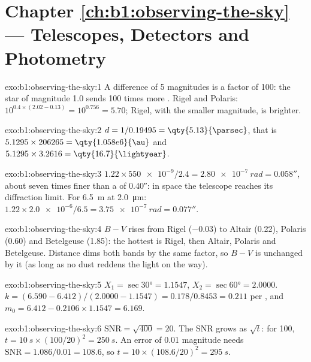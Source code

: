 \section*{Chapter \ref{ch:b1:observing-the-sky} --- Telescopes, Detectors and Photometry}

\begin{solution}{exo:b1:observing-the-sky:1}
A difference of 5 magnitudes is a factor of 100: the star of magnitude 1.0
sends 100 times more . Rigel and Polaris: $10^{0.4\times(2.02 - 0.13)} =
10^{0.756} = 5.70$; Rigel, with the smaller magnitude, is brighter.
\end{solution}

\begin{solution}{exo:b1:observing-the-sky:2}
$d = 1/0.19495 = \qty{5.13}{\parsec}$, that is $5.1295\times206265 =
\qty{1.058e6}{\au}$ and $5.1295\times3.2616 = \qty{16.7}{\lightyear}$.
\end{solution}

\begin{solution}{exo:b1:observing-the-sky:3}
$1.22\times\num{550e-9}/2.4 = \qty{2.80e-7}{rad} = \ang{;;0.058}$, about
seven times finer than a  of \ang{;;0.40}: in space the telescope
reaches its diffraction limit. For \qty{6.5}{m} at \qty{2.0}{\micro\metre}:
$1.22\times\num{2.0e-6}/6.5 = \qty{3.75e-7}{rad} = \ang{;;0.077}$.
\end{solution}

\begin{solution}{exo:b1:observing-the-sky:4}
$B - V$ rises from Rigel ($-0.03$) to Altair (0.22), Polaris (0.60) and
Betelgeuse (1.85): the hottest is Rigel, then Altair, Polaris and
Betelgeuse. Distance dims both bands by the same factor, so $B - V$ is
unchanged by it (as long as no dust reddens the light on the way).
\end{solution}

\begin{solution}{exo:b1:observing-the-sky:5}
$X_1 = \sec\ang{30} = 1.1547$, $X_2 = \sec\ang{60} = 2.0000$.
$k = (6.590 - 6.412)/(2.0000 - 1.1547) = 0.178/0.8453 = \num{0.211}$ per
, and $m_0 = 6.412 - 0.2106\times1.1547 = 6.169$.
\end{solution}

\begin{solution}{exo:b1:observing-the-sky:6}
$\mathrm{SNR} = \sqrt{400} = 20$. The SNR grows as $\sqrt t$: for 100,
$t = \qty{10}{s}\times(100/20)^2 = \qty{250}{s}$. An error of \num{0.01}
magnitude needs $\mathrm{SNR} = 1.086/0.01 = 108.6$, so
$t = 10\times(108.6/20)^2 = \qty{295}{s}$.
\end{solution}

